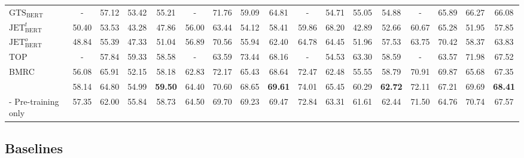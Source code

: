 \documentclass[sigconf]{acmart}
\begin{document}
\begin{table*}[ht!]
{\begin{tabular}{l|cccc|cccc|cccc|cccc}
\hline
$\mathrm{GTS}_{\mathrm{BERT}}$ \cite{wu2020grid} & - & 57.12 & 53.42 & 55.21 & - & 71.76 & 59.09 & 64.81 & - & 54.71 & 55.05 & 54.88 & - & 65.89 & 66.27 & 66.08 \\
$\mathrm{JET}_{\mathrm{BERT}}^{t}$ \cite{xu2020position} & 50.40 & 53.53 & 43.28 & 47.86 & 56.00 & 63.44 & 54.12 & 58.41 & 59.86 & 68.20 & 42.89 & 52.66 & 60.67 & 65.28 & 51.95 & 57.85 \\
$\mathrm{JET}_{\mathrm{BERT}}^{o}$ \cite{xu2020position} & 48.84 & 55.39 & 47.33 & 51.04 & 56.89 & 70.56 & 55.94 & 62.40 & 64.78 & 64.45 & 51.96 & 57.53 & 63.75 & 70.42 & 58.37 & 63.83 \\
TOP \cite{huang2021first} & - & 57.84 & 59.33 & 58.58 & - & 63.59 & 73.44 & 68.16 & - & 54.53 & 63.30 & 58.59 & - & 63.57 & 71.98 & 67.52 \\
BMRC \cite{chen2021bidirectional} & 56.08 & 65.91 & 52.15 & 58.18 & 62.83 & 72.17 & 65.43 & 68.64 & 72.47 & 62.48 & 55.55 & 58.79 & 70.91 & 69.87 & 65.68 & 67.35 \\
\hline
\textbf{\mymodel{}}   & 58.14 & 64.80  & 54.99 &  \textbf{59.50}   &  64.40  & 70.60   & 68.65 &  \textbf{69.61}  & 74.01 & 65.45 & 60.29 &  \textbf{62.72}  & 72.11 & 67.21 & 69.69 &  \textbf{68.41} \\
 \hspace{6mm} - Pre-training only        & 57.35  & 62.00 & 55.84 &  58.73 &  64.50 & 69.70 & 69.23 & 69.47 & 72.84 & 63.31 & 61.61 & 62.44 & 71.50 & 64.76 & 70.74 & 67.57  \\
\bottomrule
\end{tabular}
}
\end{table*}



\subsection{Baselines}
\end{document}
